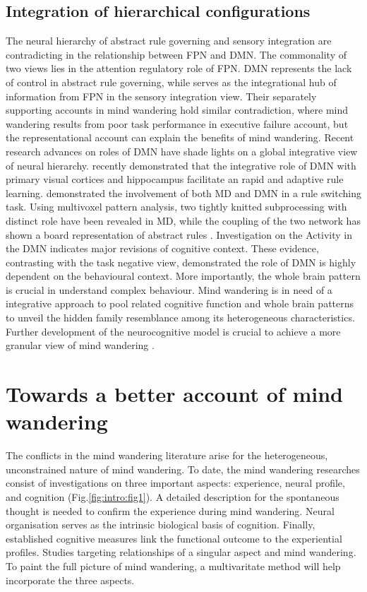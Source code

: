 \subsection{Integration of hierarchical configurations}

The neural hierarchy of abstract rule governing and sensory integration are contradicting in the relationship between FPN and DMN. The commonality of two views lies in the attention regulatory role of FPN. DMN represents the lack of control in abstract rule governing, while serves as the integrational hub of information from FPN in the sensory integration view. Their separately supporting accounts in mind wandering hold similar contradiction, where mind wandering results from poor task performance in executive failure account, but the representational account can explain the benefits of mind wandering. Recent research advances on roles of DMN have shade lights on a global integrative view of neural hierarchy.  recently demonstrated that the integrative role of DMN with primary visual cortices and hippocampus facilitate an rapid and adaptive rule learning. \cite{Crittenden2015,Crittenden2016} demonstrated the involvement of both MD and DMN in a rule switching task. Using multivoxel pattern analysis, two tightly knitted subprocessing with distinct role have been revealed in MD, while the coupling of the two network has shown a board representation of abstract rules \cite{Crittenden2016}. Investigation on the Activity in the DMN indicates major revisions of cognitive context. These evidence, contrasting with the task negative view, demonstrated the role of DMN is highly dependent on the behavioural context. More importantly, the whole brain pattern is crucial in understand complex behaviour. Mind wandering is in need of a integrative approach to pool related cognitive function and whole brain patterns to unveil the hidden family resemblance among its heterogeneous characteristics. Further development of the neurocognitive model is crucial to achieve a more granular view of mind wandering \cite{Mittner2016,SmallwoodFrontiers2013}.

\section{Towards a better account of mind wandering}

The conflicts in the mind wandering literature arise for the heterogeneous, unconstrained nature of mind wandering. To date, the mind wandering researches consist of investigations on three important aspects: experience, neural profile, and cognition (Fig.\ref{fig:intro:fig1}). A detailed description for the spontaneous thought is needed to confirm the experience during mind wandering. Neural organisation serves as the intrinsic biological basis of cognition. Finally, established cognitive measures link the functional outcome to the experiential profiles. Studies targeting relationships of a singular aspect and mind wandering. To paint the full picture of mind wandering, a multivaritate method will help incorporate the three aspects. 


